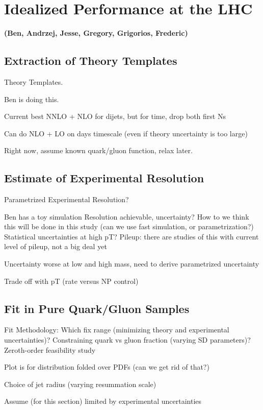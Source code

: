 \documentclass[11pt,letterpaper]{article}
\newcommand{\info}[1]{\textbf{\textcolor{mildred}{(#1)}}}
\begin{document}
\section{Idealized Performance at the LHC}

\info{Ben, Andrzej, Jesse, Gregory, Grigorios, Frederic}

\subsection{Extraction of Theory Templates}

	Theory Templates.

	Ben is doing this.

	Current best NNLO + NLO for dijets, but for time, drop both first Ns
 
 Can do NLO + LO on days timescale (even if theory uncertainty is too large)

 Right now, assume known quark/gluon function, relax later.


\subsection{Estimate of Experimental Resolution}

	Parametrized Experimental Resolution?

	Ben has a toy simulation
	Resolution achievable, uncertainty?
	How to we think this will be done in this study (can we use fast simulation, or parametrization?)
	Statistical uncertainties at high pT?
	Pileup:  there are studies of this with current level of pileup, not a big deal yet

	Uncertainty worse at low and high mass, need to derive parametrized uncertainty
	
	Trade off with pT (rate versus NP control)


\subsection{Fit in Pure Quark/Gluon Samples}

Fit Methodology:
	Which fix range (minimizing theory and experimental uncertainties)?
	Constraining quark vs gluon fraction (varying SD parameters)?
	Zeroth-order feasibility study
	
	Plot is for distribution folded over PDFs (can we get rid of that?)

	Choice of jet radius (varying resummation scale)

Assume (for this section) limited by experimental uncertainties
\end{document}
